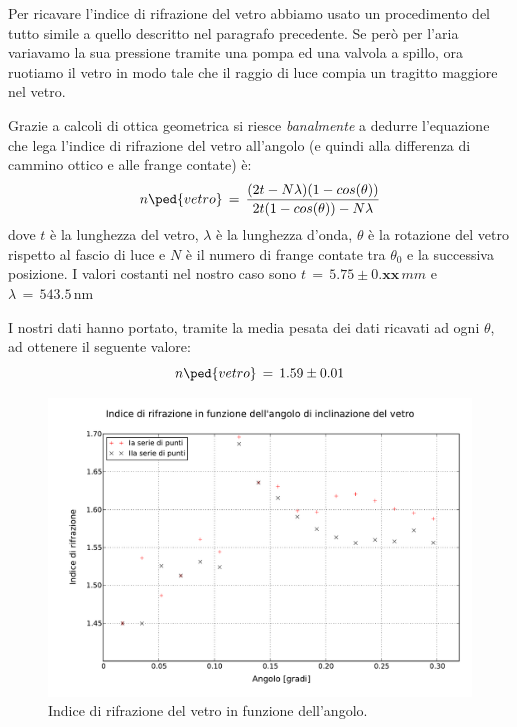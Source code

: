 Per ricavare l'indice di rifrazione del vetro abbiamo usato un procedimento del tutto simile a quello descritto nel paragrafo precedente.
Se però per l'aria variavamo la sua pressione tramite una pompa ed una valvola a spillo, ora ruotiamo il vetro in modo tale che il raggio di luce compia un tragitto maggiore nel vetro. %

Grazie a calcoli di ottica geometrica si riesce \emph{banalmente} a dedurre l'equazione che lega l'indice di rifrazione del vetro all'angolo (e quindi alla differenza di cammino ottico e alle frange contate) è:
\begin{equation}
	n\ped{vetro} \, = \, \frac{(2t - N \lambda) (1 - cos(\theta))}{2t(1-cos(\theta))-N\lambda}
\end{equation}
dove $t$ è la lunghezza del vetro, $\lambda$ è la lunghezza d'onda, $\theta$ è la rotazione del vetro rispetto al fascio di luce %
e $N$ è il numero di frange contate tra $\theta_0$ e la successiva posizione.
I valori costanti nel nostro caso sono $t \,=\, 5.75 \pm 0.\textbf{xx} \, mm$ e $\lambda \, = \, 543.5 \, \si{\nano\metre}$

I nostri dati hanno portato, tramite la media pesata dei dati ricavati ad ogni $\theta$, ad ottenere il seguente valore:
\begin{equation}
	n\ped{vetro} \, = \, 1.59 \pm 0.01
\end{equation}

\begin{figure}[t]
    \centering
        \includegraphics[width=\textwidth]{lol.pdf}
        \caption{Indice di rifrazione del vetro in funzione dell'angolo.}
        \label{fig:enne_theta}
\end{figure}
